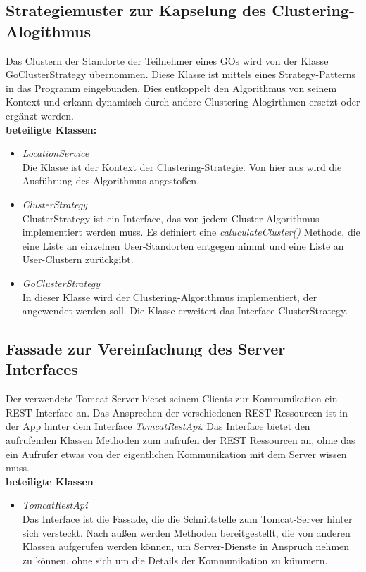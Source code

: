 \subsection{Strategiemuster zur Kapselung des Clustering-Alogithmus}
Das Clustern der Standorte der Teilnehmer eines GOs wird von der Klasse GoClusterStrategy übernommen. Diese Klasse ist mittels eines Strategy-Patterns in das Programm eingebunden. Dies entkoppelt den Algorithmus von seinem Kontext und erkann dynamisch durch andere Clustering-Alogirthmen ersetzt oder ergänzt werden. \\

\textbf{beteiligte Klassen:}
\begin{itemize}
	\item \textit{LocationService} \\
	Die Klasse ist der Kontext der Clustering-Strategie. Von hier aus wird die Ausführung des Algorithmus angestoßen.
	\item \textit{ClusterStrategy} \\
	ClusterStrategy ist ein Interface, das von jedem Cluster-Algorithmus implementiert werden muss. Es definiert eine \textit{caluculateCluster()} Methode, die eine Liste an einzelnen User-Standorten entgegen nimmt und eine Liste an User-Clustern zurückgibt.
	\item \textit{GoClusterStrategy} \\
	In dieser Klasse wird der Clustering-Algorithmus implementiert, der angewendet werden soll. Die Klasse erweitert das Interface ClusterStrategy.
\end{itemize}

\subsection{Fassade zur Vereinfachung des Server Interfaces}
Der verwendete Tomcat-Server bietet seinem Clients zur Kommunikation ein REST Interface an. Das Ansprechen der verschiedenen REST Ressourcen ist in der App hinter dem Interface \textit{TomcatRestApi}. Das Interface bietet den aufrufenden Klassen Methoden zum aufrufen der REST Ressourcen an, ohne das ein Aufrufer etwas von der eigentlichen Kommunikation mit dem Server wissen muss. \\

\textbf{beteiligte Klassen}
\begin{itemize}
	\item \textit{TomcatRestApi} \\
	Das Interface ist die Fassade, die die Schnittstelle zum Tomcat-Server hinter sich versteckt. Nach außen werden Methoden bereitgestellt, die von anderen Klassen aufgerufen werden können, um Server-Dienste in Anspruch nehmen zu können, ohne sich um die Details der Kommunikation zu kümmern.
\end{itemize}


